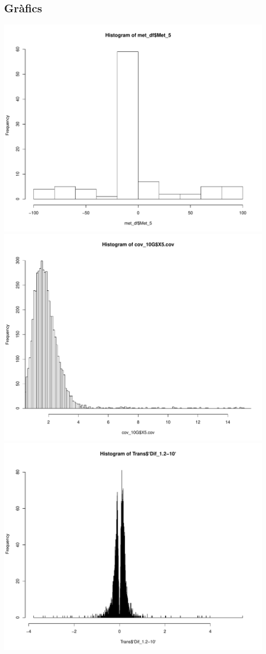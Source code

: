\documentclass{article}\usepackage[]{graphicx}\usepackage[]{color}
\newenvironment{knitrout}{}{} %
\begin{document}
\subsection{Gràfics}
\begin{knitrout}
\color{fgcolor}

{\centering \includegraphics[width=.9\linewidth]{figure/minimal-cor_graf-1} 
\includegraphics[width=.9\linewidth]{figure/minimal-cor_graf-2} 
\includegraphics[width=.9\linewidth]{figure/minimal-cor_graf-3} 

}
\end{knitrout}
\end{document}
